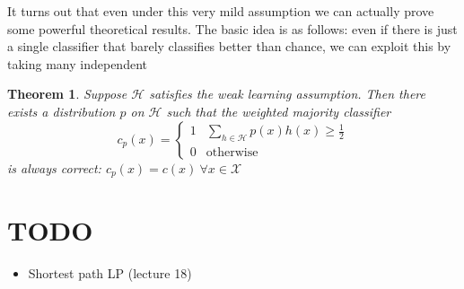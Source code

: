 \documentclass[12pt]{article}
\newtheorem{thm}{Theorem}
\begin{document}
It turns out that even under this very mild assumption we can actually prove some powerful theoretical results. The basic idea is as follows: even if there is just a single classifier that barely classifies better than 
chance, we can exploit this by taking many independent 

\begin{thm}
Suppose $\mathcal{H}$ satisfies the weak learning assumption. Then there exists a distribution $p$ on $\mathcal{H}$ such that the weighted majority classifier 
\[c_p(x) = \begin{cases} 
      1 & \sum_{h \in \mathcal{H}} p(x)h(x) \geq \frac{1}{2} \\
      0 & \text{otherwise}
   \end{cases}
\]
is always correct: $c_p(x) = c(x) \ \forall x \in \mathcal{X}$
\end{thm}


	
\section{TODO}
\begin{itemize}
\item Shortest path LP (lecture 18)
\end{itemize}
	
	
\end{document}
